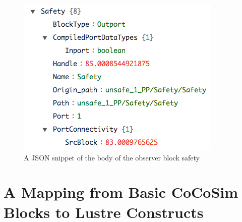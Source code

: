 \documentclass{article}
\begin{document}
\begin{figure}[h]
\begin{center}
    \includegraphics[scale=0.35]{figures/safety6}       
    
\end{center}  
  \caption{A JSON snippet of the body of the observer block safety}
  \label{jsonsafetybody}
\end{figure}

\section{A Mapping from Basic CoCoSim Blocks to Lustre Constructs}
\end{document}
